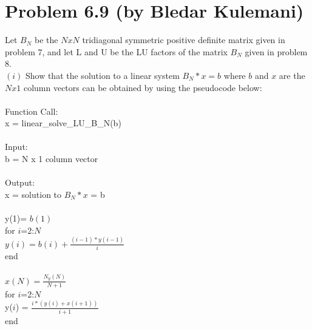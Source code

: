 \documentclass{article}
\DeclareMathOperator{\1}{\mathit{1}}
\numberwithin{figure}{section} %
\numberwithin{table}{section}
\begin{document}
\section{Problem 6.9 (by Bledar Kulemani)}
\par Let \(B_N\) be the \(NxN\) tridiagonal symmetric positive definite matrix given in problem 7, and let L and U be the LU factors of the matrix  \(B_N\) given in problem 8.\\
\((i)\) Show that the solution to a linear system \(B_N*x=b\) where \(b\) and \(x\) are the \(Nx1\) column vectors can be obtained by using the pseudocode below:\\\\
			\indent \hspace{5 cm}	Function Call:\\
			\indent \hspace{5 cm}	x = linear\_solve\_LU\_B\_N(b)\\\\
			\indent \hspace{5 cm}	Input:\\
			\indent \hspace{5 cm}	b = N x 1 column vector \\\\
			\indent \hspace{5 cm}	Output:\\
			\indent \hspace{5 cm}	x = solution to \(B_N*x\) = b\\\\
			\indent \hspace{5 cm}	y(1)= \(b(1)\) \\
			\indent \hspace{5 cm}	for \(i\)=2:\(N\) \\
			\indent \hspace{5 cm}	\indent \(y(i) = b(i) + \frac{(i-1)*y(i-1)}{i}\)\\ 
			\indent \hspace{5 cm}	end \\\\
			\indent \hspace{5 cm}	\(x(N) = \frac{N_y(N)}{N+1}\)\\
			\indent \hspace{5 cm}	for \(i\)=2:\(N\) \\
			\indent \hspace{5 cm} \indent y(\(i\)) = \(\frac{i*(y(i)+x(i+1))}{i+1}\) \\
			\indent \hspace{5 cm} end \\\\
\end{document}
